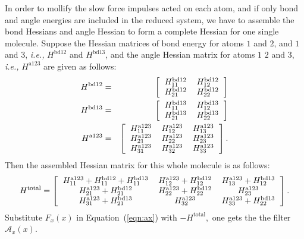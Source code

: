 \documentclass[11pt]{article}
\begin{document}
In order to mollify the slow force impulses acted on each atom, and if 
only bond and angle energies are included in the reduced system, we
have to assemble the bond Hessians and angle Hessian to form a
complete Hessian for one single molecule. Suppose the
Hessian matrices of bond energy for atoms $1$ and $2$, and $1$ and
$3$, {\it i.e.,} $H^{\mathrm{bd12}}$ and $H^{\mathrm{bd13}}$, and the
angle Hessian matrix for atoms $1$ $2$ and $3$, {\it i.e.,}
$H^{\mathrm{a123}}$ are given as follows:
\begin{eqnarray}
H^{\mathrm{bd12}} &=& \left[
\begin{tabular} {cc}
$H^{\mathrm{bd12}}_{11}$ & $H^{\mathrm{bd12}}_{12}$ \\
$H^{\mathrm{bd12}}_{21}$ & $H^{\mathrm{bd12}}_{22}$ 
\end{tabular}
\right]\\
H^{\mathrm{bd13}} &=& \left[
\begin{tabular} {cc}
$H^{\mathrm{bd13}}_{11}$ & $H^{\mathrm{bd13}}_{12}$ \\
$H^{\mathrm{bd13}}_{21}$ & $H^{\mathrm{bd13}}_{22}$ 
\end{tabular}
\right] \\
H^{\mathrm{a123}} &=& \left[
\begin{tabular} {ccc}
$H^{\mathrm{a123}}_{11}$ & $H^{\mathrm{a123}}_{12}$ &
$H^{\mathrm{a123}}_{13}$ \\
$H^{\mathrm{a123}}_{21}$ & $H^{\mathrm{a123}}_{22}$ & 
$H^{\mathrm{a123}}_{23}$ \\
$H^{\mathrm{a123}}_{31}$ & $H^{\mathrm{a123}}_{32}$ & $H^{\mathrm{a123}}_{33}$ 
\end{tabular}
\right].
\end{eqnarray}
Then the assembled Hessian matrix for this whole molecule is as follows:
\begin{equation}
H^{\mathrm{total}} = \left[
\begin{tabular} {ccc}
$H^{\mathrm{a123}}_{11}+H^{\mathrm{bd12}}_{11}+
H^{\mathrm{bd13}}_{11}$ 
& $H^{\mathrm{a123}}_{12}+H^{\mathrm{bd12}}_{12}$ &
$H^{\mathrm{a123}}_{13}+H^{\mathrm{bd13}}_{12}$  \\ 
$H^{\mathrm{a123}}_{21}+H^{\mathrm{bd12}}_{21}$   
& $H^{\mathrm{a123}}_{22}+H^{\mathrm{bd12}}_{22}$ &  
$H^{\mathrm{a123}}_{23}$  \\ 
$H^{\mathrm{a123}}_{31}+H^{\mathrm{bd13}}_{21}$  & $H^{\mathrm{a123}}_{32}$ & $H^{\mathrm{a123}}_{33}+H^{\mathrm{bd13}}_{22}$
\end{tabular}
\right].
\end{equation}
Substitute $F_x(x)$ in
Equation~(\ref{eqn:ax}) with $-H^{\mathrm{total}},$ one gets the the
filter $\mathcal{A}_{x}(x).$
\end{document}
